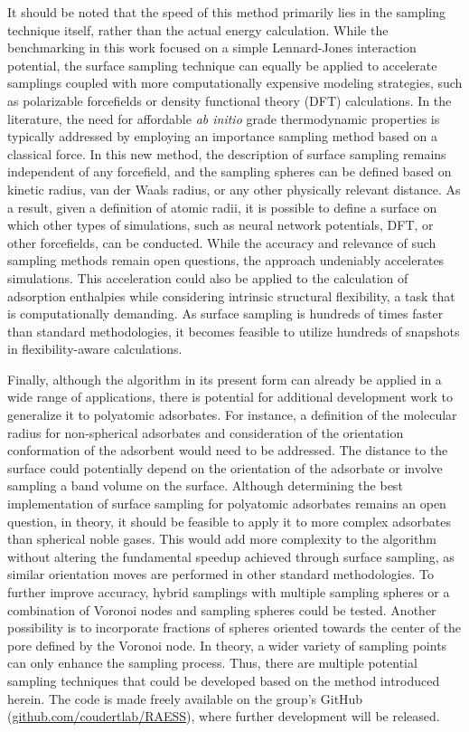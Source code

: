 \documentclass[main]{subfiles}
\begin{document}
It should be noted that the speed of this method primarily lies in the sampling technique itself, rather than the actual energy calculation. While the benchmarking in this work focused on a simple Lennard-Jones interaction potential, the surface sampling technique can equally be applied to accelerate samplings coupled with more computationally expensive modeling strategies, such as polarizable forcefields or density functional theory (DFT) calculations. In the literature, the need for affordable \emph{ab initio} grade thermodynamic properties is typically addressed by employing an importance sampling method based on a classical force.\autocite{Vandenbrande2018} In this new method, the description of surface sampling remains independent of any forcefield, and the sampling spheres can be defined based on kinetic radius, van der Waals radius, or any other physically relevant distance. {As a result, given a definition of atomic radii, it is possible to define a surface on which other types of simulations, such as neural network potentials, DFT, or other forcefields, can be conducted. While the accuracy and relevance of such sampling methods remain open questions, the approach undeniably accelerates simulations.} This acceleration could also be applied to the calculation of adsorption enthalpies while considering intrinsic structural flexibility,\autocite{Witman_2017} a task that is computationally demanding. As surface sampling is hundreds of times faster than standard methodologies, it becomes feasible to utilize hundreds of snapshots in flexibility-aware calculations.

Finally, although the algorithm in its present form can already be applied in a wide range of applications, there is potential for additional development work to generalize it to polyatomic adsorbates. For instance, {a definition of the molecular radius for non-spherical adsorbates and consideration} of the orientation conformation of the adsorbent would need to be addressed. {The distance to the surface could potentially depend on the orientation of the adsorbate or involve sampling a band volume on the surface. Although determining the best implementation of surface sampling for polyatomic adsorbates remains an open question, in theory, it should be feasible to apply it to more complex adsorbates than spherical noble gases.} This would add more complexity to the algorithm without altering the fundamental speedup achieved through surface sampling, as similar orientation moves are performed in other standard methodologies. To further improve accuracy, hybrid samplings with multiple sampling spheres or a combination of Voronoi nodes and sampling spheres could be tested. Another possibility is to incorporate fractions of spheres oriented towards the center of the pore defined by the Voronoi node. In theory, a wider variety of sampling points can only enhance the sampling process. Thus, there are multiple potential sampling techniques that could be developed based on the method introduced herein. The code is made freely available on the group's GitHub (\url{github.com/coudertlab/RAESS}), where further development will be released.
\end{document}
